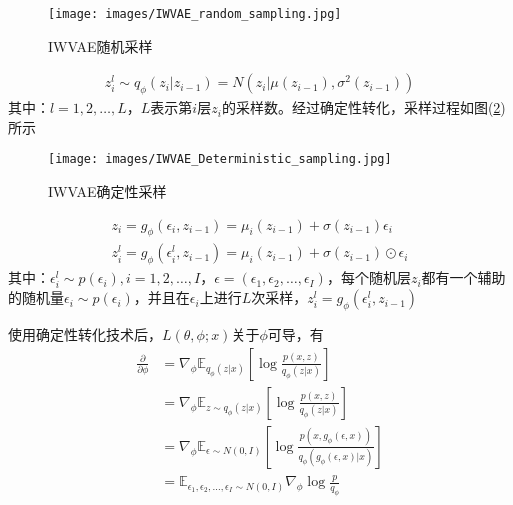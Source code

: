             \begin{figure}[H]
            \centering
            \texttt{[image: images/IWVAE\_random\_sampling.jpg]}
            \caption{IWVAE随机采样}
            \label{fig:IWVAE随机采样}
            \end{figure}
            \begin{align*}
            z_i^l \sim q_\phi(z_i|z_{i-1}) = N(z_i|\mu(z_{i-1}),\sigma^2(z_{i-1}))
            \end{align*}
            其中：$l=1,2,\dots,L$，$L$表示第$i$层$z_i$的采样数。经过确定性转化，采样过程如图(\ref{fig:IWVAE确定性采样})所示
            \begin{figure}[H]
            \centering
            \texttt{[image: images/IWVAE\_Deterministic\_sampling.jpg]}
            \caption{IWVAE确定性采样}
            \label{fig:IWVAE确定性采样}
            \end{figure}
            \begin{align*}
            z_i = g_\phi(\epsilon_i,z_{i-1}) = \mu_i(z_{i-1}) + \sigma(z_{i-1})\epsilon_i\\
            z_i^l = g_\phi(\epsilon_i^l,z_{i-1}) = \mu_i(z_{i-1}) + \sigma(z_{i-1}) \odot\epsilon_i
            \end{align*}
            其中：$\epsilon_i^l \sim p(\epsilon_i),i=1,2,\dots,I$，$\epsilon = (\epsilon_1,\epsilon_2,\dots,\epsilon_I)$，每个随机层$z_i$都有一个辅助的随机量$\epsilon_i\sim p(\epsilon_i)$，并且在$\epsilon_i$上进行$L$次采样，$z_i^l = g_\phi(\epsilon_i^l,z_{i-1})$
            \par
            使用确定性转化技术后，$L(\theta,\phi;x)$关于$\phi$可导，有
            \begin{align*}
            \frac{\partial }{\partial \phi} & = \nabla_\phi \mathbb{E} _{q_\phi(z|x)} \left[ \log \frac{p(x,z)}{q_\phi(z|x)} \right]\\
            & = \nabla_\phi \mathbb{E} _{z\sim q_\phi(z|x)} \left[ \log\frac{p(x,z)}{q_\phi(z|x)} \right]\\
            & = \nabla_\phi \mathbb{E}_{\epsilon\sim N(0,I)} \left[ \log\frac{p(x,g_\phi(\epsilon,x))}{q_\phi(g_\phi(\epsilon,x)|x)} \right]\\
            & = \mathbb{E} _{\epsilon_1,\epsilon_2,\dots,\epsilon_I \sim N(0,I)} \nabla_\phi \log\frac {p}{q_\phi}
            \end{align*}
